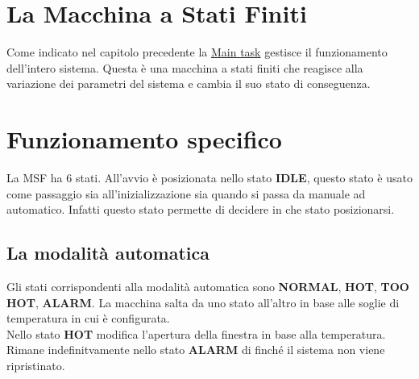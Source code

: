 \documentclass{report}
\begin{document}
\section{La Macchina a Stati Finiti}
Come indicato nel capitolo precedente la \hyperref[fig:main-task]{Main task} gestisce il funzionamento dell'intero sistema. Questa è una macchina a stati finiti che reagisce alla variazione dei parametri del sistema e cambia il suo stato di conseguenza. 

\section{Funzionamento specifico}
\par {
La MSF ha 6 stati. All'avvio è posizionata nello stato \textbf{IDLE}, questo stato è usato come passaggio sia all'inizializzazione sia quando si passa da manuale ad automatico. Infatti questo stato permette di decidere in che stato posizionarsi.
}
\subsection{La modalità automatica}

\par{
Gli stati corrispondenti alla modalità automatica sono \textbf{NORMAL}, \textbf{HOT}, \textbf{TOO HOT}, \textbf{ALARM}. La macchina salta da uno stato all'altro in base alle soglie di temperatura in cui è configurata. \\
Nello stato \textbf{HOT} modifica l'apertura della finestra in base alla temperatura. \\
Rimane indefinitvamente nello stato \textbf{ALARM} di finché il sistema non viene ripristinato.
}
\end{document}
